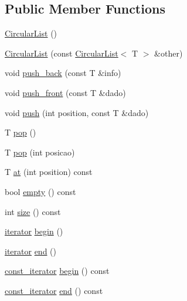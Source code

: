\subsection*{Public Member Functions}
\begin{DoxyCompactItemize}
\item 
\hyperlink{classCircularList_a93439bb2be8aabf75d1dd1d25c5dd973}{Circular\-List} ()
\item 
\hyperlink{classCircularList_aa1380278904d609012339df236148118}{Circular\-List} (const \hyperlink{classCircularList}{Circular\-List}$<$ T $>$ \&other)
\item 
void \hyperlink{classCircularList_a3e334b3918b202987c3b6f6afdacdfdc}{push\-\_\-back} (const T \&info)
\item 
void \hyperlink{classCircularList_a0a2eff26e384e8cc931c2967b1f3d846}{push\-\_\-front} (const T \&dado)
\item 
void \hyperlink{classCircularList_ad0677ce8446ff34324d55bc092241697}{push} (int position, const T \&dado)
\item 
T \hyperlink{classCircularList_a366abc7bdd1d39f474990635406d69c6}{pop} ()
\item 
T \hyperlink{classCircularList_acd9a6c877017764a869e4aa2d665c141}{pop} (int posicao)
\item 
T \hyperlink{classCircularList_af434563be90baf3d2848549489a7e7f6}{at} (int position) const 
\item 
bool \hyperlink{classCircularList_a7b0a4480af79054afc063bd4b6f11337}{empty} () const 
\item 
int \hyperlink{classCircularList_aff385139ba166907428375e6071d5f52}{size} () const 
\item 
\hyperlink{classCircularList_afe862594ad46e6d63c779b3dd100d831}{iterator} \hyperlink{classCircularList_a13e9508af90b41ef295abfe4785cb56e}{begin} ()
\item 
\hyperlink{classCircularList_afe862594ad46e6d63c779b3dd100d831}{iterator} \hyperlink{classCircularList_a1ea737b63201757b6c4098d03e9d3d55}{end} ()
\item 
\hyperlink{classCircularList_a7ecb4e9d89db260f162d1dbb79339d8a}{const\-\_\-iterator} \hyperlink{classCircularList_a5d12ddffe094492ded52a9f9db35a871}{begin} () const 
\item 
\hyperlink{classCircularList_a7ecb4e9d89db260f162d1dbb79339d8a}{const\-\_\-iterator} \hyperlink{classCircularList_a82b6631667940d89c6e2ede1c2153d56}{end} () const 
\end{DoxyCompactItemize}


